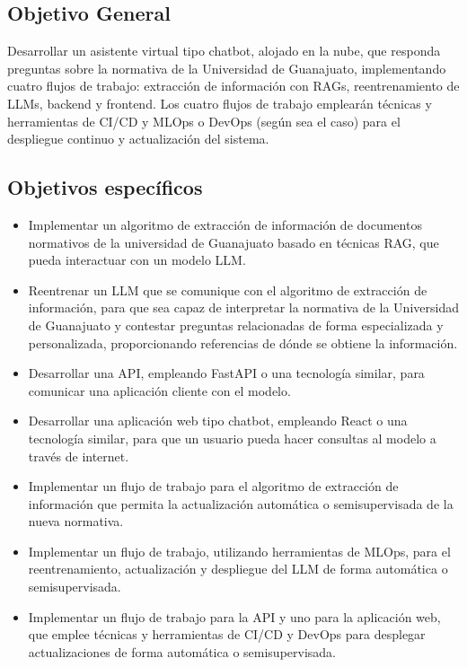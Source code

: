\subsection{Objetivo General}

Desarrollar un asistente virtual tipo chatbot, alojado en la nube, que responda
preguntas sobre la normativa de la Universidad de Guanajuato, implementando cuatro
flujos de trabajo: extracción de información con RAGs, reentrenamiento de LLMs,
backend y frontend. Los cuatro flujos de trabajo emplearán técnicas y herramientas
de CI/CD y MLOps o DevOps (según sea el caso) para el despliegue continuo y
actualización del sistema.

\subsection{Objetivos específicos}

\begin{itemize}
      \item Implementar un algoritmo de extracción de información de documentos
            normativos de la universidad de Guanajuato basado en técnicas RAG, que
            pueda interactuar con un modelo LLM.
      \item Reentrenar un LLM que se comunique con el algoritmo de extracción de
            información, para que sea capaz de interpretar la normativa de la Universidad
            de Guanajuato y contestar preguntas relacionadas de forma especializada y
            personalizada, proporcionando referencias de dónde se obtiene la información.
      \item Desarrollar una API, empleando FastAPI o una tecnología similar,
            para comunicar una aplicación cliente con el modelo.
      \item Desarrollar una aplicación web tipo chatbot, empleando React o una
            tecnología similar, para que un usuario pueda hacer consultas al modelo a
            través de internet.
      \item Implementar un flujo de trabajo para el algoritmo de extracción de
            información que permita la actualización automática o semisupervisada de
            la nueva normativa.
      \item Implementar un flujo de trabajo, utilizando herramientas de MLOps,
            para el reentrenamiento, actualización y despliegue del LLM de forma automática
            o semisupervisada.
      \item Implementar un flujo de trabajo para la API y uno para la aplicación
            web, que emplee técnicas y herramientas de CI/CD y DevOps para desplegar
            actualizaciones de forma automática o semisupervisada.
\end{itemize}

